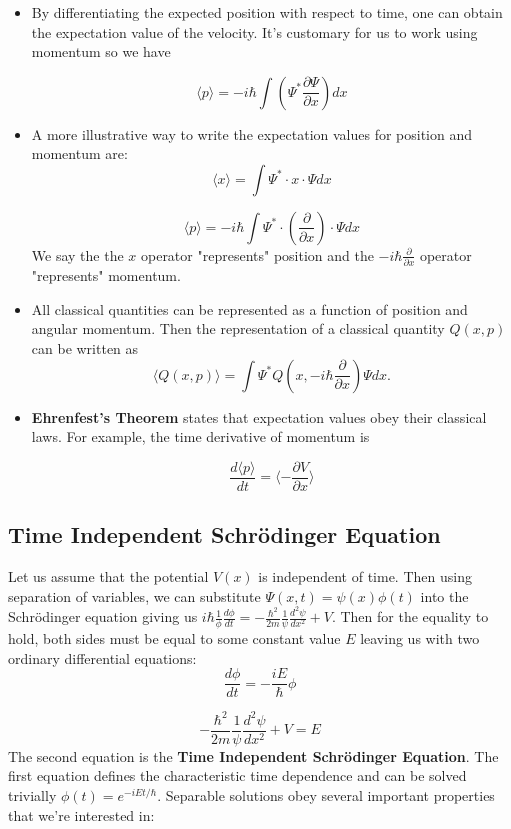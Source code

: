 \documentclass[11pt]{article}
\begin{document}
\begin{itemize}
    \item By differentiating the expected position with respect to time, one can obtain the expectation value of the velocity. It's customary for us to
    work using momentum so we have
    
    \[ 
        \langle p \rangle = -i\hbar \int \left(\Psi^{*}\frac{\partial \Psi}{\partial x}\right)dx 
    \]

    \item A more illustrative way to write the expectation values for position and momentum are:
    \[ 
        \langle x \rangle = \int \Psi^{*} \cdot x \cdot \Psi dx
    \]

    \[ 
        \langle p \rangle = -i\hbar \int \Psi^{*} \cdot \left(\frac{\partial}{\partial x}\right) \cdot \Psi dx 
    \]
    We say the the \( x \) operator "represents" position and the \( -i \hbar\frac{\partial}{\partial x} \)  operator "represents" momentum. 

    \item All classical quantities can be represented as a function of position and angular momentum. Then the representation of a classical quantity \( Q(x,p) \)
    can be written as 
    \[ 
        \langle Q(x,p) \rangle = \int \Psi^{*} Q\left(x, -i\hbar\frac{\partial}{\partial x}\right) \Psi dx. 
    \]

    \item \textbf{Ehrenfest's Theorem} states that expectation values obey their classical laws. For example, the time derivative of momentum is
    
    \[ 
        \frac{d\langle p \rangle}{dt} = \langle - \frac{\partial V}{\partial x}\rangle 
    \]

\end{itemize}

\subsection{Time Independent Schr\"odinger Equation}
Let us assume that the potential \(V(x)\) is independent of time. Then using separation of variables, we can substitute \(\Psi(x,t) = \psi(x)\phi(t)\)
into the Schr\"odinger equation giving us 
\(i\hbar\frac{1}{\phi}\frac{d\phi}{dt} = -\frac{\hbar^2}{2m} \frac{1}{\psi}\frac{d^2\psi}{dx^2} + V\). Then for the equality to hold, both sides must be equal to 
some constant value \(E\) leaving us with two ordinary differential equations:
\[
    \frac{d\phi}{dt} = -\frac{iE}{\hbar}\phi
\]

\[
    -\frac{\hbar^2}{2m}\frac{1}{\psi}\frac{d^2\psi}{dx^2} + V = E
\]
The second equation is the \textbf{Time Independent Schr\"odinger Equation}. The first equation defines the characteristic time dependence and can
be solved trivially \(\phi(t) = e^{-iEt/\hbar}\). Separable solutions obey several important properties that we're interested in:
\end{document}
